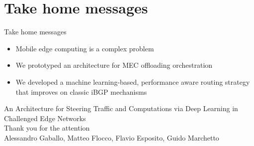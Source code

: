 \documentclass{beamer}
\begin{document}
\section*{Take home messages}
\begin{frame}{Take home messages}
\begin{itemize}
\item	Mobile edge computing is a complex problem\\
\pause
\item	We prototyped an architecture for MEC offloading orchestration\\
\pause
\item	We developed a machine learning-based, performance aware routing strategy that improves on classic iBGP mechanisms
\end{itemize}	
\end{frame} 

\begin{frame}[standout]
  \Large An Architecture for Steering Traffic and Computations
  via Deep Learning in \\ Challenged Edge Networks \\
    \vspace{1cm}
	\large Thank you for the attention\\  
  \vspace{1cm}
  {\small Alessandro Gaballo, Matteo Flocco, Flavio Esposito, Guido Marchetto}
\end{frame}
\end{document}
